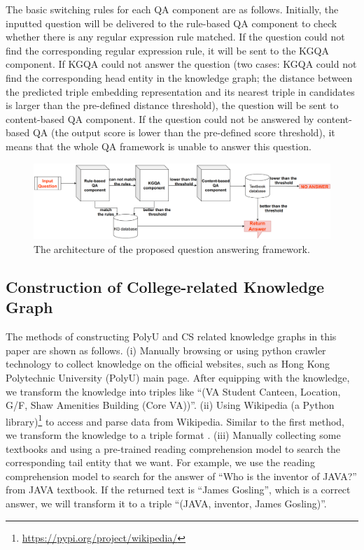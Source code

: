 \documentclass[11pt]{article}
\begin{document}
The basic switching rules for each QA component are as follows. Initially, the inputted question will be delivered to the rule-based QA component to check whether there is any regular expression rule matched. If the question could not find the corresponding regular expression rule, it will be sent to the KGQA component. If KGQA could not answer the question (two cases: KGQA could not find the corresponding head entity in the knowledge graph; the distance between the predicted triple embedding representation and its nearest triple in candidates is larger than the pre-defined distance threshold), the question will be sent to content-based QA component. If the question could not be answered by content-based QA (the output score is lower than the pre-defined score threshold), it means that the whole QA framework is unable to answer this question.

\begin{figure}[t!]
\includegraphics[width=17cm]{submissions/kbqa-colledge/figs/figure1.pdf}
\caption{The architecture of the proposed question answering framework.}
\end{figure}


\subsection{Construction of College-related Knowledge Graph }\label{sec:Knowledge Graph Construction}
The methods of constructing PolyU and CS related knowledge graphs in this paper are shown as follows. (i) Manually browsing or using python crawler technology to collect knowledge on the official websites, such as Hong Kong Polytechnic University (PolyU) main page. After equipping with the knowledge, we transform the knowledge into triples like ``(VA Student Canteen, Location, G/F, Shaw Amenities Building (Core VA))''. (ii) Using Wikipedia (a Python library)\footnote{\url{https://pypi.org/project/wikipedia/}} to access and parse data from Wikipedia. Similar to the first method, we transform the knowledge to a triple format \cite{c1, c2}. (iii) Manually collecting some textbooks and using a pre-trained reading comprehension model \cite{c19} to search the corresponding tail entity that we want. For example, we use the reading comprehension model to search for the answer of ``Who is the inventor of JAVA?'' from JAVA textbook. If the returned text is ``James Gosling'', which is a correct answer, we will transform it to a triple ``(JAVA, inventor, James Gosling)''.
\end{document}
